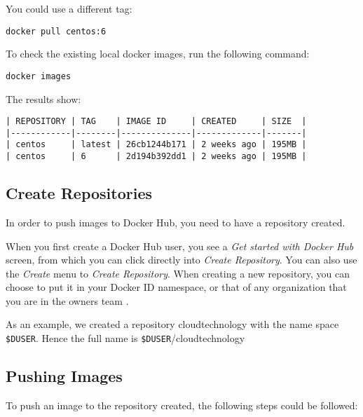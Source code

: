 You could use a different tag:

\begin{lstlisting}
docker pull centos:6
\end{lstlisting}

To check the existing local docker images, run the following command:

\begin{lstlisting}
docker images
\end{lstlisting}

The results show:

\begin{lstlisting}
| REPOSITORY | TAG    | IMAGE ID     | CREATED     | SIZE  |
|------------|--------|--------------|-------------|-------|
| centos     | latest | 26cb1244b171 | 2 weeks ago | 195MB |
| centos     | 6      | 2d194b392dd1 | 2 weeks ago | 195MB |
\end{lstlisting}

\subsection{Create Repositories}

In order to push images to Docker Hub, you need to have a repository
created.

When you first create a Docker Hub user, you see a \emph{Get started
with Docker Hub} screen, from which you can click directly into
\emph{Create Repository}. You can also use the \emph{Create} menu to
\emph{Create Repository}. When creating a new repository, you can choose
to put it in your Docker ID namespace, or that of any organization that
you are in the owners team
\cite{hid-sp18-405-tutorial-dockerhub-repository}.

As an example, we created a repository cloudtechnology with the name
space \texttt{\$DUSER}. Hence the full name is
\texttt{\$DUSER}/cloudtechnology

\subsection{Pushing Images}

To push an image to the repository created, the following steps could be
followed:

